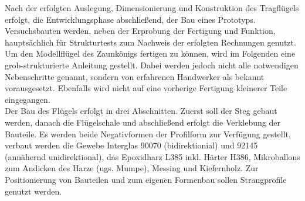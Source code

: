 Nach der erfolgten Auslegung, Dimensionierung und Konstruktion des Tragflügels erfolgt, die Entwicklungsphase abschließend, der Bau eines Prototyps. Versuchsbauten werden, neben der Erprobung der Fertigung und Funktion, hauptsächlich für Strukturtests zum Nachweis der erfolgten Rechnungen genutzt. Um den Modellflügel des Zaunkönigs fertigen zu können, wird im Folgenden eine grob-strukturierte Anleitung gestellt. Dabei werden jedoch nicht alle notwendigen Nebenschritte genannt, sondern von erfahrenen Handwerker als bekannt vorausgesetzt. Ebenfalls wird nicht auf eine vorherige Fertigung kleinerer Teile eingegangen.\\

\noindent Der Bau des Flügels erfolgt in drei Abschnitten. Zuerst soll der Steg gebaut werden, danach die Flügelschale und abschließend erfolgt die Verklebung der Bauteile.
Es werden beide Negativformen der Profilform zur Verfügung gestellt, verbaut werden die Gewebe Interglas 90070 (bidirektionial) und 92145 (annähernd unidirektional), das Epoxidharz L385 inkl. Härter H386, Mikroballons zum Andicken des Harze (ugs. Mumpe), Messing und Kiefernholz. Zur Positionierung von Bauteilen und zum eigenen Formenbau sollen Strangprofile genutzt werden. 

